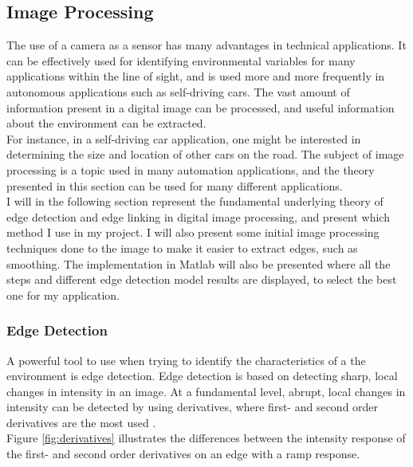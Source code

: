 \subsection{Image Processing}
The use of a camera as a sensor has many advantages in technical applications. It can be effectively used for identifying environmental variables for many applications within the line of sight, and is used more and more frequently in autonomous applications such as self-driving cars. The vast amount of information present in a digital image can be processed, and useful information about the environment can be extracted. \\

For instance, in a self-driving car application, one might be interested in determining the size and location of other cars on the road. The subject of image processing is a topic used in many automation applications, and the theory presented in this section can be used for many different applications.\\

I will in the following section represent the fundamental underlying theory of edge detection and edge linking in digital image processing, and present which method I use in my project. I will also present some initial image processing techniques done to the image to make it easier to extract edges, such as smoothing. The implementation in Matlab will also be presented where all the steps and different edge detection model results are displayed, to select the best one for my application.

\subsubsection{Edge Detection}
A powerful tool to use when trying to identify the characteristics of a the environment is edge detection. Edge detection is based on detecting sharp, local changes in intensity in an image. At a fundamental level, abrupt, local changes in intensity can be detected by using derivatives, where first- and second order derivatives are the most used \cite{g}. \\

Figure \ref{fig:derivatives} illustrates the differences between the intensity response of the first- and second order derivatives on an edge with a ramp response.

